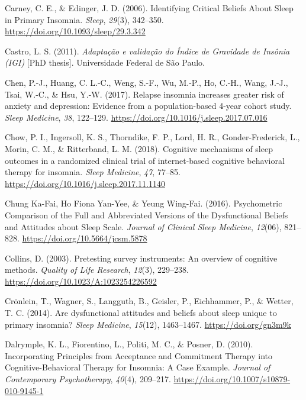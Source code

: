 \documentclass[
  ,doc,11pt, twoside,floatsintext]{apa6}
\newlength{\cslhangindent}
\newlength{\cslentryspacingunit} %
\newenvironment{CSLReferences}[2] %
 {%
  \setlength{\parindent}{0pt}
  \ifodd #1
  \let\oldpar\par
  \def\par{\hangindent=\cslhangindent\oldpar}
  \fi
  \setlength{\parskip}{#2\cslentryspacingunit}
 }%
 {}
\begin{document}
\begin{CSLReferences}{1}{0}
\leavevmode{}%
Carney, C. E., \& Edinger, J. D. (2006). Identifying {Critical Beliefs About Sleep} in {Primary Insomnia}. \emph{Sleep}, \emph{29}(3), 342--350. \url{https://doi.org/10.1093/sleep/29.3.342}

\leavevmode{}%
Castro, L. S. (2011). \emph{Adaptação e validação do {Índice} de {Gravidade} de {Insônia} ({IGI})} {[}PhD thesis{]}. Universidade Federal de São Paulo.

\leavevmode{}%
Chen, P.-J., Huang, C. L.-C., Weng, S.-F., Wu, M.-P., Ho, C.-H., Wang, J.-J., Tsai, W.-C., \& Hsu, Y.-W. (2017). Relapse insomnia increases greater risk of anxiety and depression: Evidence from a population-based 4-year cohort study. \emph{Sleep Medicine}, \emph{38}, 122--129. \url{https://doi.org/10.1016/j.sleep.2017.07.016}

\leavevmode{}%
Chow, P. I., Ingersoll, K. S., Thorndike, F. P., Lord, H. R., Gonder-Frederick, L., Morin, C. M., \& Ritterband, L. M. (2018). Cognitive mechanisms of sleep outcomes in a randomized clinical trial of internet-based cognitive behavioral therapy for insomnia. \emph{Sleep Medicine}, \emph{47}, 77--85. \url{https://doi.org/10.1016/j.sleep.2017.11.1140}

\leavevmode{}%
Chung Ka-Fai, Ho Fiona Yan-Yee, \& Yeung Wing-Fai. (2016). Psychometric {Comparison} of the {Full} and {Abbreviated Versions} of the {Dysfunctional Beliefs} and {Attitudes} about {Sleep Scale}. \emph{Journal of Clinical Sleep Medicine}, \emph{12}(06), 821--828. \url{https://doi.org/10.5664/jcsm.5878}

\leavevmode{}%
Collins, D. (2003). Pretesting survey instruments: {An} overview of cognitive methods. \emph{Quality of Life Research}, \emph{12}(3), 229--238. \url{https://doi.org/10.1023/A:1023254226592}

\leavevmode{}%
Crönlein, T., Wagner, S., Langguth, B., Geisler, P., Eichhammer, P., \& Wetter, T. C. (2014). Are dysfunctional attitudes and beliefs about sleep unique to primary insomnia? \emph{Sleep Medicine}, \emph{15}(12), 1463--1467. \url{https://doi.org/gn3m9k}

\leavevmode{}%
Dalrymple, K. L., Fiorentino, L., Politi, M. C., \& Posner, D. (2010). Incorporating {Principles} from {Acceptance} and {Commitment Therapy} into {Cognitive-Behavioral Therapy} for {Insomnia}: {A Case Example}. \emph{Journal of Contemporary Psychotherapy}, \emph{40}(4), 209--217. \url{https://doi.org/10.1007/s10879-010-9145-1}


\end{CSLReferences}
\end{document}
